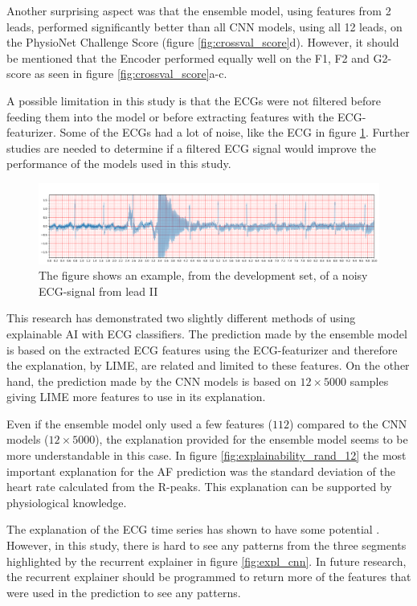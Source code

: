 Another surprising aspect was that the ensemble model, using features from 2 leads, performed significantly better than all CNN models, using all 12 leads, on the PhysioNet Challenge Score (figure \ref{fig:crossval_score}d). However, it should be mentioned that the Encoder performed equally well on the F1, F2 and G2-score as seen in figure \ref{fig:crossval_score}a-c.

A possible limitation in this study is that the ECGs were not filtered before feeding them into the model or before extracting features with the ECG-featurizer. Some of the ECGs had a lot of noise, like the ECG in figure \ref{fig:noisy_leadII}. Further studies are needed to determine if a filtered ECG signal would improve the performance of the models used in this study.

\begin{figure}[!hbp]
    \centering
    \includegraphics[width=.90\textwidth]{Figures/noisy_leadII.png}
    \caption{The figure shows an example, from the development set, of a noisy ECG-signal from lead II}
    \label{fig:noisy_leadII}
\end{figure}

This research has demonstrated two slightly different methods of using explainable AI with ECG classifiers. The prediction made by the ensemble model is based on the extracted ECG features using the ECG-featurizer and therefore the explanation, by LIME, are related and limited to these features. On the other hand, the prediction made by the CNN models is based on $12 \times 5000$ samples giving LIME more features to use in its explanation.




Even if the ensemble model only used a few features ($112$) compared to the CNN models ($12 \times 5000$), the explanation provided for the ensemble model seems to be more understandable in this case. In figure \ref{fig:explainability_rand_12} the most important explanation for the AF prediction  was the standard deviation of the heart rate calculated from the R-peaks. This explanation can be supported by physiological knowledge.

The explanation of the ECG time series has shown to have some potential \cite{strodthoff_deep_2020,zhang_interpretable_2020}. However, in this study, there is hard to see any patterns from the three segments highlighted by the recurrent explainer in figure \ref{fig:expl_cnn}. In future research, the recurrent  explainer should be programmed to return more of the features that were used in the prediction to see any patterns.

